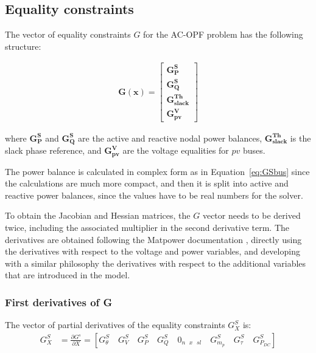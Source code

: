 \subsection{Equality constraints}

The vector of equality constraints $G$ for the AC-OPF problem has the following structure:

\begin{equation}
    \begin{split}
        \bm{G}(\bm{x}) = \begin{bmatrix}
            \bm{G^{S}_{P}}\\
            \bm{G^{S}_{Q}}\\
            \bm{G^{Th}_{slack}}\\
            \bm{G^{V}_{pv}}
            \end{bmatrix}
    \end{split}
\end{equation}

where $\bm{G^{S}_{P}}$ and $\bm{G^{S}_{Q}}$ are the active and reactive nodal power balances, $\bm{G^{Th}_{slack}}$ is the slack phase reference, and
$\bm{G^{V}_{pv}}$ are the voltage equalities for $pv$ buses.

The power balance is calculated in complex form as in Equation~\eqref{eq:GSbus} since the calculations are much more compact, and then it is split into active and reactive power balances, 
since the values have to be real numbers for the solver. 

To obtain the Jacobian and Hessian matrices, the $G$ vector needs to be derived twice, including the associated multiplier in the second derivative term.
The derivatives are obtained following the Matpower documentation \cite{zimmermanTN2}, directly using the derivatives with respect to the voltage
and power variables, and developing with a similar philosophy the derivatives with respect to the additional variables that are introduced in the model.

\subsubsection{First derivatives of G}

The vector of partial derivatives of the equality constraints $G^S_X$ is:
\begin{equation}
\begin{split}
    G^S_X &= \frac{\partial G^s}{\partial X} = \left[ G^S_{\theta} \quad G^S_V \quad G^S_P \quad G^S_Q \quad 0_{n \text{ } x \text{ } sl} \quad G^S_{m_p} \quad G^S_{\tau} \quad G^S_{P_{DC}}\right] \\
\end{split}
\end{equation}

